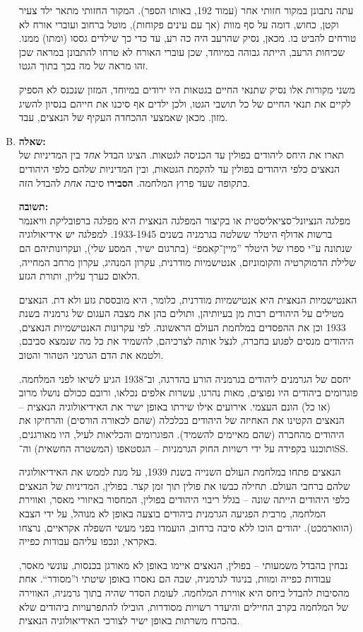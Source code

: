 \documentclass[a4paper]{article}
\newcommand\hl[1]   {#1}
\begin{document}
\begin{enumerate}[A.]
			עתה נתבונן במקור חזותי אחר (עמוד 192, באותו הספר). המקור החזותי מתאר ילד צעיר וקטן, כחוש, דומה על סף מוות (אך עם עינים פקוחות), מוטל ברחוב ועוברי אורח לא טורחים להביט בו. מכאן, נסיק שהרעב היה כה רע, עד כדי כך שילדים גססו (ומתו) ממנו. שכיחות הרעב, הייתה גבוהה במיוחד, שכן עוברי האורח לא טרחו להתבונן במראה שכן זהו מראה של מה בכך בתוך הגטו. 
			
			משני מקורות אלו נסיק שתנאי החיים בגטאות היו ירודים במיוחד, המזון שנכנס לא הספיק לקיים את תנאי החיים של כל תושבי הגטו, ולכן ילדים אף סיכנו את חייהם בנסיון להשיג מזון. מכאן שאמצעי ההכחדה העקיף של הנאצים, עבד. 
			
			\item \textbf{שאלה: }\\
			תארו את היחס ליהודים בפולין עד הכניסה לגטאות. הציגו הבדל \textit{אחד} בין המדיניות של הנאצים כלפי היהודים בפולין עד להקמת הגטאות, ובין המדיניות שלהם כלפי היהודים בתקופה שעד פרוץ המלחמה. \textbf{הסבירו} סיבה \textit{אחת} להבדל הזה. 
			
			\textbf{תשובה: }\\
			מפלגה הנציונל־סציאליסטית או בקיצור המפלגה ה\hl{נאצית} היא מפלגה ברפובליקת וויאנמר ברשות \hl{אדולף היטלר} ששלטה בגרמניה בשנים 1933-1945. למפלגה יש אידיאולוגיה שנתונה ע''י ספרו של היטלר ''מיין־קאמפ`` (בתרגום ישיר, המסע שלי), ועקרונותיהם הם שלילת הדמוקרטיה והקומוניזם, אנטישמיות מודרנית, עקרון המנהיג, עקרון מרחב המחייה, הלאום כערך עליון, ותורת הגזע. 
			
			האנטישמיות הנאצית היא אנטישמיות מודרנית, כלומר, היא מובססת גזע ולא דת. הנאצים מטילים על היהודים רבות מן בעיותיהן, ותולים בהן את מצבה העגום של גרמניה בשנת 1933 וכן את ההפסדים במלחמת העולם הראשונה. לפי עקרונות האנטישמיות הנאצים, היהודים מנסים לפגוע בחברה, לנצל אותה לצרכיהם, להשמיד את כל מה שנמצא סביבם, ולטמא את הדם הגרמני הטהור והטוב. 
			
			יחסם של הגרמנים ליהודים בגרמניה הורע בהדרגה, וב־1938 הגיע לשיאו לפני המלחמה. פוגרומים ביהודים היו נפוצים, מאות נהרגו, עשרות אלפים נכלאו, ורובם ככולם נושלו מרוב (או כל) הונם העצמי. אירועים אילו שירתו באופן ישיר את האידיאולוגיה הנאצית – הנאצים הקטינו את האחיזה של היהודים בכלכלה (שהם לכאורה הורסים) והרחיקו את היהודים מהחברה (שהם מאיימים להשמיד). הפוגרומים והכליאות לעיל, היו מאורגנים, ותוכננו בקפידה על ידי רשויות החוק הגרמניות – הגסטאפו (המשטרה החשאית) וה־SS. 
			
			הנאצים פתחו במלחמת העולם השנייה בשנת 1939, על מנת לממש את האידיאולוגיה שלהם ברחבי העולם. תחילה כבשו את פולין תוך זמן קצר. בפולין, המדיניות של הנאצים כלפי היהודים הייתה שונה – בגלל ריבוי היהודים בפולין, המחסור באיזורי מאסר, ואווירת המלחמה, מרבית הפגיעה הגרמנית ביהודים בוצעה באופן לא מנוהל, על ידי הצבא (הווארמכט). יהודים הוכו ללא סיבה ברחוב, הועמדו בפני מעשי השפלה אקראיים, נרצחו באקראי, ונכפו עליהם עבודות כפייה. 
			
			נבחין בהבדל משמעותי – בפולין, הנאצים איימו באופן לא מאורגן בכנסות, עונשי מאסר, עבודות כפייה ומוות, בניגוד לגרמניה, שבה הם נאסרו באופן שיטתי ו''מסודר``. אחת מהסיבות להבדל ביחס היא אווירת המלחמה. לעומת הסדר שהיה בתוך גרמניה, האווירה של המלחמה בקרב החיילים והיעדר רשויות מסודרות, הובילו להתפרעויות ביהודים שלא בהכרח משרתות באופן ישיר לצורכי האידיאולוגיה הנאצית. 
			
		\end{enumerate}
	
\end{document}
